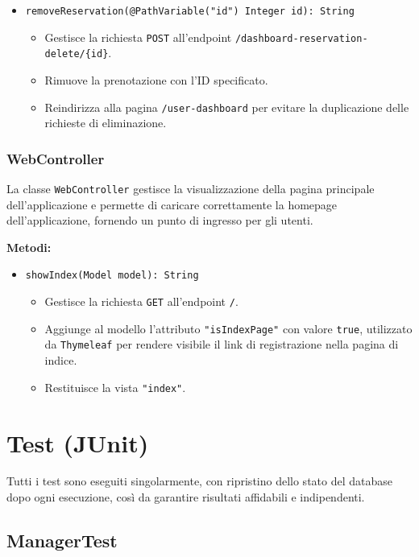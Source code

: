 \documentclass[twoside,openright,titlepage,fleqn,headinclude,12pt,a4paper,BCOR=5mm,footinclude]{scrbook}
\begin{document}
\begin{itemize}
    \item \texttt{removeReservation(@PathVariable("id") Integer id): String}  
    \begin{itemize}  
        \item Gestisce la richiesta \texttt{POST} all'endpoint \texttt{/dashboard-reservation-delete/\{id\}}.  
        \item Rimuove la prenotazione con l'ID specificato.  
        \item Reindirizza alla pagina \texttt{/user-dashboard} per evitare la duplicazione delle richieste di eliminazione.  
    \end{itemize}  
\end{itemize}  


\subsection{WebController}
La classe \texttt{WebController} gestisce la visualizzazione della pagina principale dell'applicazione e permette di caricare correttamente la homepage dell’applicazione, fornendo un punto di ingresso per gli utenti. 

\textbf{Metodi:}  
\begin{itemize}  
    \item \texttt{showIndex(Model model): String}  
    \begin{itemize}  
        \item Gestisce la richiesta \texttt{GET} all'endpoint \texttt{/}.  
        \item Aggiunge al modello l’attributo \texttt{"isIndexPage"} con valore \texttt{true}, utilizzato da \texttt{Thymeleaf} per rendere visibile il link di registrazione nella pagina di indice.  
        \item Restituisce la vista \texttt{"index"}.  
    \end{itemize}  
\end{itemize}  

\chapter{Test (JUnit) }


Tutti i test sono eseguiti singolarmente, con ripristino dello stato del database dopo ogni esecuzione, così da garantire risultati affidabili e indipendenti.

\section{ManagerTest}
\end{document}
